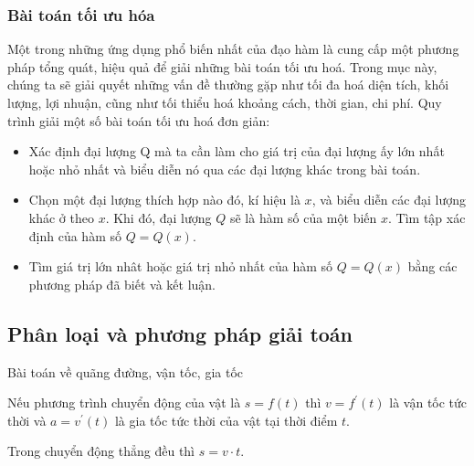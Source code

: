 \subsubsection{Bài toán tối ưu hóa}
Một trong những ứng dụng phổ biến nhất của đạo hàm là cung cấp một phương pháp tổng quát, hiệu quả để giải những bài toán tối ưu hoá. Trong mục này, chúng ta sẽ giải quyết những vấn đề thường gặp như tối đa hoá diện tích, khối lượng, lợi nhuận, cũng như tối thiểu hoá khoảng cách, thời gian, chi phí. Quy trình giải một số bài toán tối ưu hoá  đơn giản:
	\begin{itemize}
		\item[\iconCH] Xác định đại lượng Q mà ta cần làm cho giá trị của đại lượng ấy lớn nhất hoặc nhỏ nhất và biểu diễn nó qua các đại lượng khác trong bài toán.
		
		\item[\iconCH]  Chọn một đại lượng thích hợp nào đó, kí hiệu là $x$, và biểu diễn các đại lượng khác ở  theo $x$. Khi đó, đại lượng $Q$ sẽ là hàm số của một biến $x$. Tìm tập xác định của hàm số $Q=Q(x)$.
		
		\item[\iconCH]  Tìm giá trị lớn nhât hoặc giá trị nhỏ nhất của hàm số $Q=Q(x)$ bằng các phương pháp đã biết và kết luận.
	\end{itemize}
\subsection{Phân loại và phương pháp giải toán}
\begin{dang}{Bài toán về quãng đường, vận tốc, gia tốc}
	\begin{listEX}[1]
		\item [\ding{172}] Nếu phương trình chuyển động của vật là $s=f(t)$ thì $v=f^{\prime}(t)$ là vận tốc tức thời và $a=v^{\prime}(t)$ là gia tốc tức thời của vật tại thời điểm $t$.
		\item [\ding{173}] Trong chuyển động thẳng đều thì $s=v \cdot t$.
	\end{listEX}
\end{dang}


